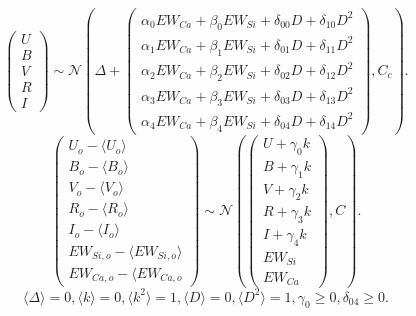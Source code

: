 \documentclass[11pt, oneside]{article}   	%
\begin{document}
\begin{equation*}
\left(
\begin{matrix}
U\\B\\V\\R\\I
\end{matrix}
\right) \sim \mathcal{N}
\left(
\Delta +
\left(
\begin{matrix}
\alpha_0 EW_{Ca} + \beta_0 EW_{Si} +\delta_{00} D +\delta_{10} D^2\\
\alpha_1 EW_{Ca} + \beta_1 EW_{Si} +\delta_{01} D  +\delta_{11} D^2\\
\alpha_2 EW_{Ca} + \beta_2 EW_{Si} +\delta_{02} D +\delta_{12} D^2\\
\alpha_3 EW_{Ca} + \beta_3 EW_{Si} +\delta_{03} D +\delta_{13} D^2\\
\alpha_4 EW_{Ca} + \beta_4 EW_{Si}+\delta_{04} D +\delta_{14} D^2
\end{matrix}
\right)
,C_{c}
\right).
\end{equation*}
\begin{equation*}
\left(
\begin{matrix}
U_o -\langle U_o \rangle \\B_o-\langle B_o \rangle\\ V_o-\langle V_o \rangle\\R_o-\langle R_o \rangle\\I_o-\langle I_o \rangle\\EW_{Si, o}-\langle EW_{Si, o} \rangle\\ EW_{Ca, o}-\langle EW_{Ca, o} 
\end{matrix}
\right) \sim \mathcal{N}
\left(
\left(
\begin{matrix}
U +\gamma_0 k \\B +\gamma_1 k \\V+\gamma_2 k\\R+\gamma_3 k\\I+\gamma_4 k\\
EW_{Si}\\ EW_{Ca}
\end{matrix}
\right)
,C
\right).
\end{equation*}
\begin{equation*}
\langle \Delta \rangle=0, \langle k \rangle=0, \langle k^2 \rangle=1, \langle D \rangle=0, \langle D^2 \rangle=1, \gamma_0 \ge 0, \delta_{04}\ge0.
\end{equation*}
\end{document}

